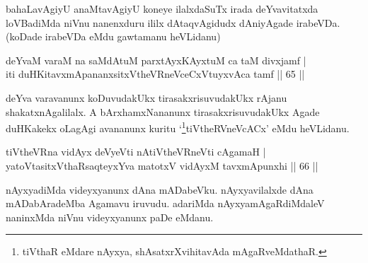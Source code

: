 \begin{artha}
bahaLavAgiyU anaMtavAgiyU koneye ilalxdaSuTx irada deYvavitatxda loVBadiMda niVnu nanenxduru ililx dAtaqvAgidudx dAniyAgade irabeVDa. (koDade irabeVDa eMdu gawtamanu heVLidanu)
\end{artha}


\begin{shl}
deYvaM varaM na saMdAtuM parxtAyxKAyxtuM ca taM divxjamf | \\
iti duHKitavxmApananxsitxVtheVRneVceCxVtuyxvAca tamf \hfill|| 65 || 
\end{shl}

\begin{artha}
deYva varavanunx koDuvudakUkx tirasakxrisuvudakUkx rAjanu 
shakatxnAgalilalx. A bArxhamxNananunx tirasakxrisuvudakUkx Agade 
duHKakekx oLagAgi avananunx kuritu `\footnote[1]{tiVthaR eMdare 
nAyxya, shAsatxrXvihitavAda mAgaRveMdathaR.}tiVtheRVneVcACx' eMdu heVLidanu.
\end{artha}


\begin{shl}
tiVtheVRna vidAyx deVyeVti \footnotemark[2]nAtiVtheVRneVti cA\s \s gamaH | \\
yatoV\s tasitxVthaRsaqteyxYva matotxV vidAyxM tavxmApunxhi \hfill|| 66 || 
\end{shl}

\begin{artha}
nAyxyadiMda videyxyanunx dAna mADabeVku. nAyxyavilalxde dAna mADabAradeMba Agamavu iruvudu. adariMda nAyxyamAgaRdiMdaleV naninxMda niVnu videyxyanunx paDe eMdanu.
\end{artha}


